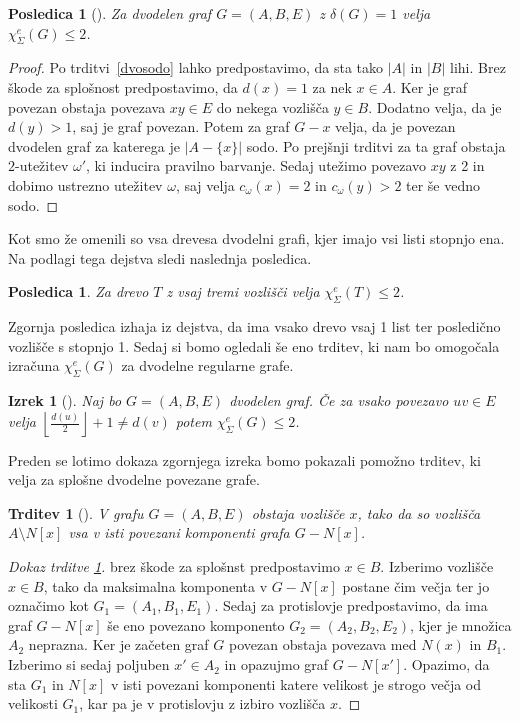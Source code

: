 \documentclass[12pt,a4paper,twoside]{article}
\theoremstyle{definition} %
\theoremstyle{plain} %
\newtheorem{izrek}[definicija]{Izrek}
\newtheorem{trditev}[definicija]{Trditev}
\newtheorem{posledica}[definicija]{Posledica}
\newcommand{\ec}{\chi_{\Sigma}^e}
\numberwithin{equation}{section}  %
\begin{document}
\begin{posledica}[\citet{examples}]
Za dvodelen graf $G = (A, B, E)$ z $\delta(G)=1$ velja $\ec(G)  \le 2$.
\end{posledica}
\begin{proof}
Po trditvi~\ref{dvosodo} lahko predpostavimo, da sta tako $|A|$ in $|B|$ lihi. Brez škode za splošnost predpostavimo, da $d(x) = 1$ za nek $x \in A$. Ker je graf povezan obstaja povezava $xy \in E$ do nekega vozlišča $y \in B$. Dodatno velja, da je $d(y) > 1$, saj je graf povezan. Potem za graf $G - x$ velja, da je povezan dvodelen graf  za katerega je $|A -  \{x\}|$ sodo. Po prejšnji trditvi za ta graf obstaja $2$-utežitev $\omega'$, ki inducira pravilno barvanje. Sedaj utežimo povezavo $xy$ z 2 in dobimo ustrezno utežitev $\omega$, saj velja $c_{\omega}(x) = 2$ in $c_{\omega}(y) > 2$ ter še vedno sodo.
\end{proof}
Kot smo že omenili so vsa drevesa dvodelni grafi, kjer imajo vsi listi stopnjo ena. Na podlagi tega dejstva sledi naslednja posledica.
\begin{posledica}
\label{res_tree}
Za drevo $T$ z vsaj tremi vozlišči velja $\ec(T) \le 2$.
\end{posledica}
Zgornja posledica izhaja iz dejstva, da ima vsako drevo vsaj 1 list ter posledično vozlišče s stopnjo 1. Sedaj si bomo ogledali še eno trditev, ki nam bo omogočala izračuna $\ec(G)$ za dvodelne regularne grafe.
\begin{izrek}[\citet{examples}]
\label{dvoreg}
Naj bo $G = (A,B, E)$ dvodelen graf. Če za vsako povezavo $uv \in E$ velja $\left \lfloor \frac{d(u)}{2} \right \rfloor + 1 \neq d(v) $ potem $\ec(G) \le 2$.
\end{izrek}
Preden se lotimo dokaza zgornjega izreka bomo pokazali pomožno trditev, ki velja za splošne dvodelne povezane grafe.
\begin{trditev}[\citet{examples}]
\label{t1}
V grafu $G = (A, B, E)$ obstaja vozlišče $x$, tako da so vozlišča $A \setminus N[x]$ vsa v isti povezani komponenti grafa $G -  N[x]$.
\end{trditev}

\begin{proof}[Dokaz trditve \ref{t1}]
brez škode za splošnst predpostavimo $x \in B$. Izberimo vozlišče $x \in B$, tako da  maksimalna komponenta v $G - N[x]$ postane čim večja ter jo označimo kot $G_1 = (A_1, B_1, E_1)$. Sedaj za protislovje predpostavimo, da ima graf  $G - N[x]$ še eno povezano komponento $G_2 = (A_2, B_2, E_2)$, kjer je množica $A_2$ neprazna. Ker je začeten graf $G$ povezan obstaja povezava med $N(x)$ in $B_1$.  Izberimo si sedaj poljuben $x' \in A_2$ in opazujmo graf $G - N[x']$. Opazimo, da sta $G_1$ in $N[x]$ v isti povezani komponenti katere velikost je strogo večja od velikosti $G_1$, kar pa je v protislovju z izbiro vozlišča $x$.
\end{proof}
\end{document}
